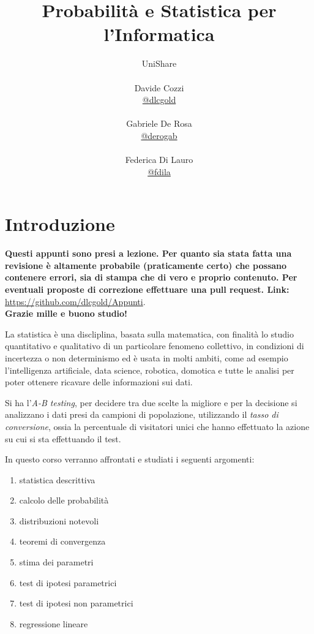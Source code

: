 \documentclass[a4paper,12pt, oneside]{book}
\title{Probabilità e Statistica per l'Informatica}
\author{UniShare\\\\Davide Cozzi\\\href{https://t.me/dlcgold}{@dlcgold}\\\\Gabriele De Rosa\\\href{https://t.me/derogab}{@derogab} \\\\Federica Di Lauro\\\href{https://t.me/f_dila}{@f\textunderscore dila}}
\date{}
\begin{document}
\maketitle
\tableofcontents


\newtheorem{teorema}{Teorema}
\newtheorem{definizione}{Definizione}
\newtheorem{esempio}{Esempio}
\newtheorem{corollario}{Corollario}
\newtheorem{lemma}{Lemma}
\newtheorem{osservazione}{Osservazione}
\newtheorem{nota}{Nota}
\newtheorem{esercizio}{Esercizio}
\newcommand{\mean}[1]{\overline #1}
\renewcommand{\chaptermark}[1]{%
\markboth{\chaptername
\ \thechapter.\ #1}{}}
\renewcommand{\sectionmark}[1]{\markright{\thesection.\ #1}}
\chapter{Introduzione}
\textbf{Questi appunti sono presi a lezione. Per quanto sia stata fatta una revisione è altamente probabile (praticamente certo) che possano contenere errori, sia di stampa che di vero e proprio contenuto. Per eventuali proposte di correzione effettuare una pull request. Link: } \url{https://github.com/dlcgold/Appunti}.\\
\textbf{Grazie mille e buono studio!}

La statistica è una discliplina, basata sulla matematica, con finalità lo studio quantitativo e qualitativo
di un particolare fenomeno collettivo, in condizioni di incertezza o non determinismo ed è usata in molti 
ambiti, come ad esempio l'intelligenza artificiale, data science, robotica, domotica e tutte le analisi 
per poter ottenere ricavare delle informazioni sui dati.

Si ha l'\emph{A-B testing}, per decidere tra due scelte la migliore e per la decisione si analizzano i dati
presi da campioni di popolazione, utilizzando il \emph{tasso di conversione}, ossia la percentuale di visitatori unici
che hanno effettuato la azione su cui si sta effettuando il test.

In questo corso verranno affrontati e studiati i seguenti argomenti:
\begin{enumerate}
    \item statistica descrittiva
    \item calcolo delle probabilità
    \item distribuzioni notevoli
    \item teoremi di convergenza
    \item stima dei parametri
    \item test di ipotesi parametrici
    \item test di ipotesi non parametrici
    \item regressione lineare
\end{enumerate}
\end{document}
